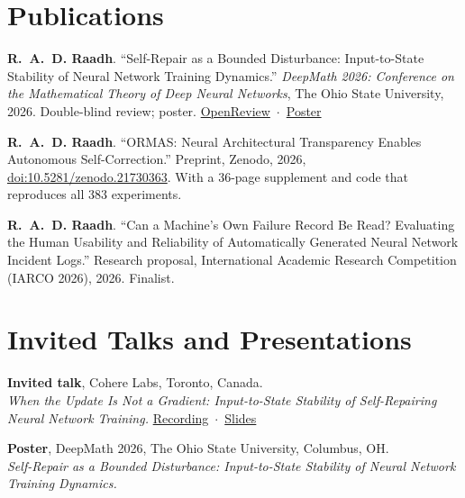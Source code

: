 \documentclass[10pt,a4paper]{article}
\newcommand{\cvitem}[3]{%
  \begin{list}{}{%
    \setlength{\leftmargin}{2.35cm}%
    \setlength{\labelwidth}{2.1cm}%
    \setlength{\labelsep}{0.25cm}%
    \setlength{\itemindent}{0pt}%
    \setlength{\listparindent}{0pt}%
    \setlength{\rightmargin}{0pt}%
    \setlength{\topsep}{0pt}%
    \setlength{\partopsep}{0pt}%
    \setlength{\parsep}{0pt}%
    \setlength{\itemsep}{0pt}%
  }%
  \item[{\makebox[2.1cm][l]{\footnotesize\color{muted}#1}}]%
  #2
  #3
  \end{list}%
  \vspace{1.5pt}
}
\begin{document}
\section*{Publications}
\begin{pubs}
  \item \textbf{R.~A.~D. Raadh}. ``Self-Repair as a Bounded Disturbance: Input-to-State Stability of Neural Network Training Dynamics.'' \textit{DeepMath 2026: Conference on the Mathematical Theory of Deep Neural Networks}, The Ohio State University, 2026. Double-blind review; poster. \mbox{\href{https://openreview.net/forum?id=kowltBZEIv}{OpenReview} $\cdot$ \href{https://www.raadh.me/deepmath}{Poster}}
\end{pubs}
\begin{pubs}[resume]
  \item \textbf{R.~A.~D. Raadh}. ``ORMAS: Neural Architectural Transparency Enables Autonomous Self-Correction.'' Preprint, Zenodo, 2026, \href{https://doi.org/10.5281/zenodo.21730363}{doi:10.5281/zenodo.21730363}. With a 36-page supplement and code that reproduces all 383 experiments.
\end{pubs}
\begin{pubs}[resume]
  \item \textbf{R.~A.~D. Raadh}. ``Can a Machine's Own Failure Record Be Read? Evaluating the Human Usability and Reliability of Automatically Generated Neural Network Incident Logs.'' Research proposal, International Academic Research Competition (IARCO 2026), 2026. Finalist.
\end{pubs}

\section*{Invited Talks and Presentations}
\cvitem{Nov 2026}{%
  \textbf{Invited talk}, Cohere Labs, Toronto, Canada.\\
  {\small\textit{When the Update Is Not a Gradient: Input-to-State Stability of Self-Repairing Neural Network Training.} \mbox{\href{https://www.youtube.com/watch?v=R75wEi3Ti-M}{Recording} $\cdot$ \href{https://www.raadh.me/assets/pdf/Raadh_CohereLabs_2026_When_the_Update_Is_Not_a_Gradient.pdf}{Slides}}}
}{}
\cvitem{Oct 2026}{%
  \textbf{Poster}, DeepMath 2026, The Ohio State University, Columbus, OH.\\
  {\small\textit{Self-Repair as a Bounded Disturbance: Input-to-State Stability of Neural Network Training Dynamics.}}
}{}
\end{document}
